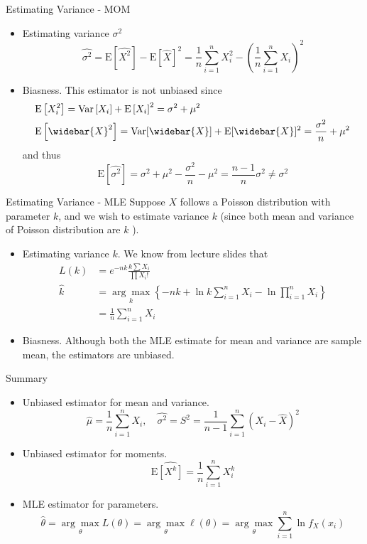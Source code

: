 \documentclass{beamer}
\begin{document}
\begin{frame}{Estimating Variance - MOM}
\begin{itemize}
\item Estimating variance $\sigma^{2}$
$$
\widehat{\sigma^{2}}=\mathrm{E}[\widehat{X^{2}}]-\mathrm{E}[\widehat{X}]^{2}=\frac{1}{n} \sum_{i=1}^{n} X_{i}^{2}-(\frac{1}{n} \sum_{i=1}^{n} X_{i})^{2}
$$
\item Biasness. This estimator is not unbiased since
$$
\begin{aligned}
&\mathrm{E}\left[X_{i}^{2}\right]=\operatorname{Var}\left[X_{i}\right]+\mathrm{E}\left[X_{i}\right]^{2}=\sigma^{2}+\mu^{2} \\
&\mathrm{E}\left[\widebar{X}^{2}\right]=\operatorname{Var}[\widebar{X}]+\mathrm{E}[\widebar{X}]^{2}=\frac{\sigma^{2}}{n}+\mu^{2}
\end{aligned}
$$
and thus
$$
\mathrm{E}\left[\widehat{\sigma^{2}}\right]=\sigma^{2}+\mu^{2}-\frac{\sigma^{2}}{n}-\mu^{2}=\frac{n-1}{n} \sigma^{2} \neq \sigma^{2}
$$
\end{itemize}
\end{frame}

\begin{frame}{Estimating Variance - MLE}
Suppose $X$ follows a Poisson distribution with parameter $k$, and we wish to estimate variance $k$ (since both mean and variance of Poisson distribution are $k$ ).
\begin{itemize}
\item Estimating variance $k$. We know from lecture slides that
$$
\begin{aligned}
L(k) &=e^{-n k} \frac{k \sum X_{i}}{\prod X_{i} !} \\
\widehat{k} &=\underset{k}{\arg \max }\left\{-n k+\ln k \sum_{i=1}^{n} X_{i}-\ln \prod_{i=1}^{n} X_{i}\right\} \\
&=\frac{1}{n} \sum_{i=1}^{n} X_{i}
\end{aligned}
$$
\item Biasness. Although both the MLE estimate for mean and variance are sample mean, the estimators are unbiased.
\end{itemize}
\end{frame}

\begin{frame}{Summary}
\begin{itemize}
\item Unbiased estimator for mean and variance.
$$
\widehat{\mu}=\frac{1}{n} \sum_{i=1}^{n} X_{i}, \quad \widehat{\sigma^{2}}=S^{2}=\frac{1}{n-1} \sum_{i=1}^{n}\left(X_{i}-\widehat{X}\right)^{2}
$$
\item Unbiased estimator for moments.
$$
\mathrm{E}\widehat{\left[X^{k}\right]}=\frac{1}{n} \sum_{i=1}^{n} X_{i}^{k}
$$
\item MLE estimator for parameters.
$$
\widehat{\theta}=\underset{\theta}{\arg \max } L(\theta)=\underset{\theta}{\arg \max } \ell(\theta)=\underset{\theta}{\arg \max } \sum_{i=1}^{n} \ln f_{X}\left(x_{i}\right)
$$
\end{itemize}
\end{frame}
\end{document}
